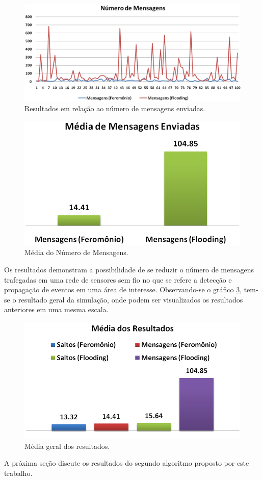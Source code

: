  \begin{figure}[h!]
 \centering
 \includegraphics[width=13cm]{results/messages.png}
 \caption{Resultados em relação ao número de mensagens enviadas.}
  \label{fig:messages}
 \end{figure}

 \begin{figure}[h!]
 \centering
 \includegraphics{results/messages_mean.png}
 \caption{Média do Número de Mensagens.}
  \label{fig:messages_mean}
 \end{figure}

Os resultados demonstram a possibilidade de se reduzir o número de mensagens trafegadas em uma rede de sensores sem fio no que se refere a detecção e propagação de eventos em uma área de interesse. Observando-se o gráfico \ref{fig:global_mean}, tem-se o resultado geral da simulação, onde podem ser visualizados os resultados anteriores em uma mesma escala.

\begin{figure}[h!]
 \centering
 \includegraphics{results/global_mean.png}
 \caption{Média geral dos resultados.}
  \label{fig:global_mean}
 \end{figure}

A próxima seção discute os resultados do segundo algoritmo proposto por este trabalho. 

